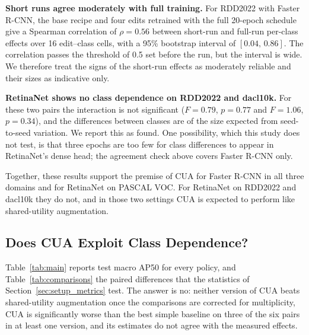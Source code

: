 \documentclass[conference]{IEEEtran}
\begin{document}
\noindent\textbf{Short runs agree moderately with full training.} For RDD2022 with Faster R-CNN, the base recipe and four edits retrained with the full 20-epoch schedule give a Spearman correlation of $\rho=0.56$ between short-run and full-run per-class effects over 16 edit--class cells, with a 95\% bootstrap interval of $[0.04,\,0.86]$. The correlation passes the threshold of 0.5 set before the run, but the interval is wide. We therefore treat the signs of the short-run effects as moderately reliable and their sizes as indicative only.

\noindent\textbf{RetinaNet shows no class dependence on RDD2022 and dacl10k.} For these two pairs the interaction is not significant ($F=0.79$, $p=0.77$ and $F=1.06$, $p=0.34$), and the differences between classes are of the size expected from seed-to-seed variation. We report this as found. One possibility, which this study does not test, is that three epochs are too few for class differences to appear in RetinaNet's dense head; the agreement check above covers Faster R-CNN only.

Together, these results support the premise of CUA for Faster R-CNN in all three domains and for RetinaNet on PASCAL VOC. For RetinaNet on RDD2022 and dacl10k they do not, and in those two settings CUA is expected to perform like shared-utility augmentation.

\subsection{Does CUA Exploit Class Dependence?}
\label{sec:results_comparison}

Table~\ref{tab:main} reports test macro AP50 for every policy, and Table~\ref{tab:comparisons} the paired differences that the statistics of Section~\ref{sec:setup_metrics} test. The answer is no: neither version of CUA beats shared-utility augmentation once the comparisons are corrected for multiplicity, CUA is significantly worse than the best simple baseline on three of the six pairs in at least one version, and its estimates do not agree with the measured effects.
\end{document}
